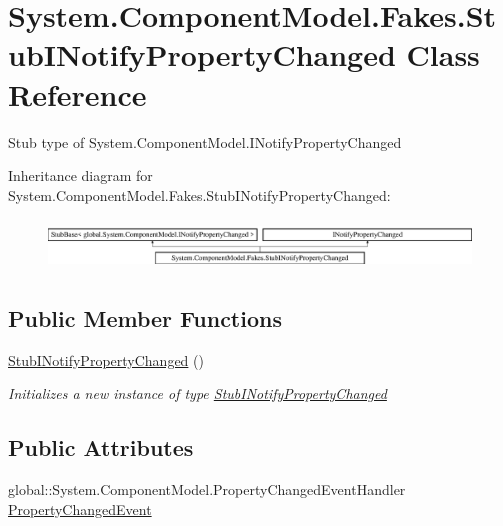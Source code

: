 \hypertarget{class_system_1_1_component_model_1_1_fakes_1_1_stub_i_notify_property_changed}{\section{System.\-Component\-Model.\-Fakes.\-Stub\-I\-Notify\-Property\-Changed Class Reference}
\label{class_system_1_1_component_model_1_1_fakes_1_1_stub_i_notify_property_changed}
}


Stub type of System.\-Component\-Model.\-I\-Notify\-Property\-Changed 


Inheritance diagram for System.\-Component\-Model.\-Fakes.\-Stub\-I\-Notify\-Property\-Changed\-:\begin{figure}[H]
\begin{center}
\leavevmode
\includegraphics[height=1.342926cm]{class_system_1_1_component_model_1_1_fakes_1_1_stub_i_notify_property_changed}
\end{center}
\end{figure}
\subsection*{Public Member Functions}
\begin{DoxyCompactItemize}
\item 
\hyperlink{class_system_1_1_component_model_1_1_fakes_1_1_stub_i_notify_property_changed_a82b0f8006ecc9675639ff85ffee8b54b}{Stub\-I\-Notify\-Property\-Changed} ()
\begin{DoxyCompactList}\small\item\em Initializes a new instance of type \hyperlink{class_system_1_1_component_model_1_1_fakes_1_1_stub_i_notify_property_changed}{Stub\-I\-Notify\-Property\-Changed}\end{DoxyCompactList}\end{DoxyCompactItemize}
\subsection*{Public Attributes}
\begin{DoxyCompactItemize}
\item 
global\-::\-System.\-Component\-Model.\-Property\-Changed\-Event\-Handler \hyperlink{class_system_1_1_component_model_1_1_fakes_1_1_stub_i_notify_property_changed_addbbbc96dd5827be1f65fdfa32cb84ec}{Property\-Changed\-Event}
\end{DoxyCompactItemize}



